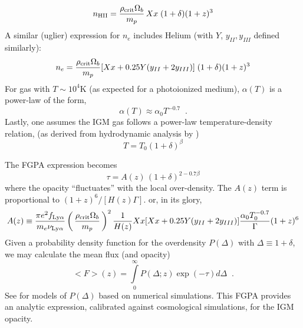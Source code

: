 \documentclass[graybox]{svmult}
\def\ltp{\left ( \,}
\def\rtp{\, \right  ) }
\def\intl{\int\limits}
\begin{document}
\begin{equation}
n_{\rm HII} = \frac{\rho_{\rm crit} \Omega_b}{m_p} \, X x \; (1+\delta) (1+z)^3
\end{equation}
A similar (uglier) expression for $n_e$ includes Helium 
(with $Y$, $y_{II}, y_{III}$ defined similarly):
\begin{equation}
n_e = \frac{\rho_{\rm crit} \Omega_b}{m_p} [Xx + 0.25Y(y_{II} + 2y_{III})] \; (1+\delta) (1+z)^3
\end{equation}
For gas with $T \sim 10^4$K (as expected for a photoionized medium),
$\alpha(T)$ is a power-law of the form,
\begin{equation}
\alpha(T) \approx \alpha_0 T^{-0.7} \;\; .
\end{equation}
Lastly, one assumes the IGM gas follows a power-law temperature-density
relation, (as derived from hydrodynamic analysis by \cite{HuiGnedin97})
\begin{equation}
T = T_0 (1+\delta)^\beta
\label{eqn:rhoT}
\end{equation}

The FGPA expression becomes
\begin{equation}
\tau = A(z) \, (1+\delta)^{2 - 0.7 \beta}
\end{equation}
where the opacity ``fluctuates'' with the local over-density.
The $A(z)$ term is proportional to  $(1+z)^6 / [H(z) \Gamma]$.
or, in its glory,
\begin{equation}
A(z) \equiv \frac{\pi e^2 f_{\rm Ly\alpha}}{m_e \nu_{\rm Ly\alpha}}
\ltp \frac{\rho_{\rm crit} \Omega_b}{m_p} \rtp^2 
\frac{1}{H(z)} Xx [Xx + 0.25Y(y_{II} + 2y_{III})] \frac{\alpha_0 T_0^{-0.7}}{\Gamma}
(1+z)^6
\end{equation}
Given a probability density function for the overdensity
$P(\Delta)$ with $\Delta \equiv 1 + \delta$, we 
may calculate the mean flux (and opacity)
\begin{equation}
<F>(z) = \intl_0^\infty P(\Delta; z) \exp(-\tau) d\Delta \;\; .
\label{eqn:fgpa}
\end{equation}
See \cite{miralda00} for models of $P(\Delta)$
based on numerical simulations.
This FGPA provides an analytic expression, calibrated
against cosmological simulations, for the IGM opacity.
\end{document}
